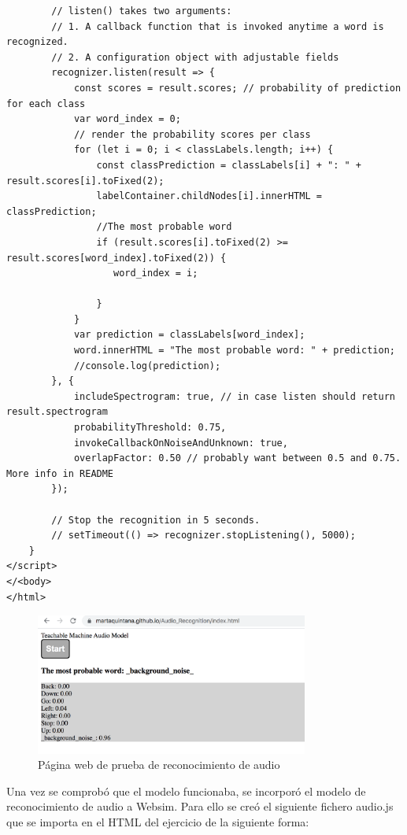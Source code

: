 \begin{lstlisting}
        // listen() takes two arguments:
        // 1. A callback function that is invoked anytime a word is recognized.
        // 2. A configuration object with adjustable fields
        recognizer.listen(result => {
            const scores = result.scores; // probability of prediction for each class
            var word_index = 0;
            // render the probability scores per class
            for (let i = 0; i < classLabels.length; i++) {
                const classPrediction = classLabels[i] + ": " + result.scores[i].toFixed(2);
                labelContainer.childNodes[i].innerHTML = classPrediction;
                //The most probable word
                if (result.scores[i].toFixed(2) >= result.scores[word_index].toFixed(2)) {
                   word_index = i;

                }
            }
            var prediction = classLabels[word_index];
            word.innerHTML = "The most probable word: " + prediction;
            //console.log(prediction);
        }, {
            includeSpectrogram: true, // in case listen should return result.spectrogram
            probabilityThreshold: 0.75,
            invokeCallbackOnNoiseAndUnknown: true,
            overlapFactor: 0.50 // probably want between 0.5 and 0.75. More info in README
        });

        // Stop the recognition in 5 seconds.
        // setTimeout(() => recognizer.stopListening(), 5000);
    }
</script>
</<body>
</html>

\end{lstlisting}


\begin{figure}[H]
    \centering
    \includegraphics[width=0.8\textwidth, height=0.4\textwidth]{chapters/images/audioprueba.png}
    \caption{Página web de prueba de reconocimiento de audio}
    \label{fig:my_label}
\end{figure}

Una vez se comprobó que el modelo funcionaba, se incorporó  el modelo de reconocimiento de audio a Websim. Para ello  se creó el siguiente fichero audio.js que se importa en el HTML del ejercicio de la siguiente forma:   

